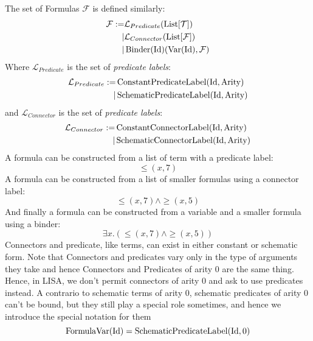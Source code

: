 \begin{defin}[Formulas]
The set of Formulas $\mathcal{F}$ is defined similarly:
\begin{equation}
\begin{split}
\mathcal{F} := & \mathcal{L}_{Predicate}(\operatorname{List}[\mathcal{T}]) \\
              \mid & \mathcal{L}_{Connector}(\operatorname{List}[\mathcal{F}]) \\
              \mid & \operatorname{Binder}(\textnormal{Id})(\operatorname{Var}(\textnormal{Id}), \mathcal{F})
\end{split}
\end{equation}
Where $\mathcal{L}_{Predicate}$ is the set of \textit{predicate labels}:
\begin{equation}
\begin{split}
\mathcal{L}_{Predicate} := & \operatorname{ConstantPredicateLabel}(\textnormal{Id}, \textnormal{Arity})\\
              \mid & \operatorname{SchematicPredicateLabel}(\textnormal{Id}, \textnormal{Arity})
\end{split}
\end{equation}
and $\mathcal{L}_{Connector}$ is the set of \textit{predicate labels}:
\begin{equation}
\begin{split}
\mathcal{L}_{Connector} := & \operatorname{ConstantConnectorLabel}(\textnormal{Id}, \textnormal{Arity})\\
              \mid & \operatorname{SchematicConnectorLabel}(\textnormal{Id}, \textnormal{Arity})
\end{split}
\end{equation}
A formula can be constructed from a list of term with a predicate label:
$${\leq}(x, 7)$$
A formula can be constructed from a list of smaller formulas using a connector label: 
$${\leq}(x, 7) \land {\geq}(x, 5)$$
And finally a formula can be constructed from a variable and a smaller formula using a binder:
$$\exists x. \left({\leq}(x, 7) \land {\geq}(x, 5)\right)$$
Connectors and predicate, like terms, can exist in either constant or schematic form. Note that Connectors and predicates vary only in the type of arguments they take and hence Connectors and Predicates of arity 0 are the same thing. Hence, in LISA, we don't permit connectors of arity 0 and ask to use predicates instead.
A contrario to schematic terms of arity 0, schematic predicates of arity 0 can't be bound, but they still play a special role sometimes, and hence we introduce the special notation for them
$$
\operatorname{FormulaVar}(\textnormal{Id}) = \operatorname{SchematicPredicateLabel}(\textnormal{Id}, 0)
$$
\end{defin}
